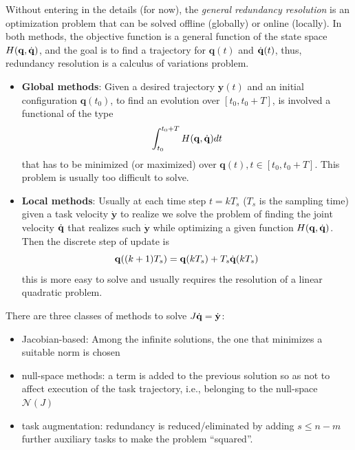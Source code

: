 \documentclass[10pt, a4paper]{report}
\begin{document}
Without entering in the details (for now), the \textit{general redundancy resolution} is an optimization problem that can be solved offline (globally) or online (locally). In both methods, the objective function is a general function of the state space $H(\mathbf q,{\dot{\mathbf q}})$, and the goal is to find a trajectory for $\mathbf q(t)$ and ${\dot{\mathbf q}}(t)$, thus, redundancy resolution is a calculus of variations problem.
\begin{itemize}
    \item \textbf{Global methods}: Given a desired trajectory $\mathbf y(t)$ and an initial configuration $\mathbf q(t_0)$, to find an evolution over $[t_0,t_0+T]$, is involved a functional of the type\begin{equation}
     \int_{t_0}^{t_0+T}H(\mathbf q,{\dot{\mathbf q}})dt   
    \end{equation}
    that has to be minimized (or maximized) over $\mathbf q(t), t\in [t_0,t_0+T]$. This problem is usually too difficult to solve. 
    \item \textbf{Local methods}: Usually at each time step $t=kT_s$ ($T_s$ is the sampling time) given a task velocity $\dot{\mathbf y}$ to realize we solve the problem of finding the joint velocity ${\dot{\mathbf q}}$ that realizes such $\dot{\mathbf y}$ while optimizing a given function $H(\mathbf q,{\dot{\mathbf q}})$. Then the discrete step of update is \begin{equation}
        \mathbf q((k+1)T_s)=\mathbf q(kT_s)+T_s{\dot{\mathbf q}}(kT_s)
    \end{equation}
    this is more easy to solve and usually requires the resolution of a linear quadratic problem.
\end{itemize}
There are three classes of methods to solve $J{\dot{\mathbf q}}=\dot{\mathbf y}$:\begin{itemize}
    \item Jacobian-based: Among the infinite solutions, the one that minimizes a suitable norm is chosen 
    \item null-space methods: a term is added to the previous solution so as not to affect execution
of the task trajectory, i.e., belonging to the null-space $\mathcal N(J)$
    \item task augmentation: redundancy is reduced/eliminated by adding $s\le n-m$ further auxiliary tasks to make the problem ``squared''.
\end{itemize}
\end{document}
